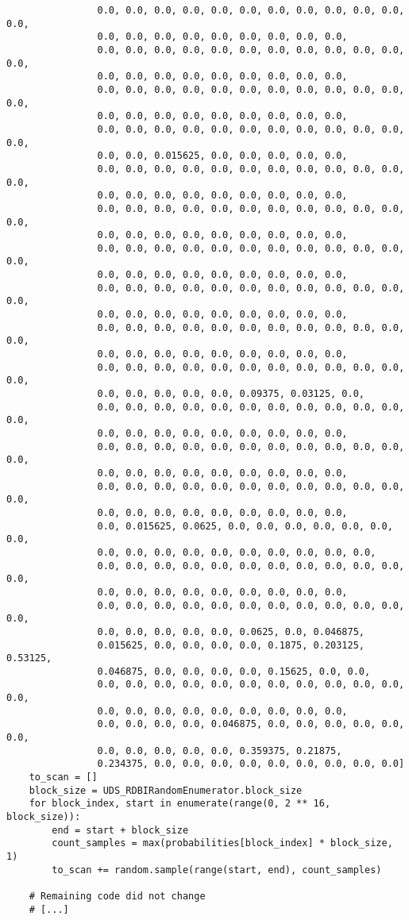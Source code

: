 \begin{verbatim}
                0.0, 0.0, 0.0, 0.0, 0.0, 0.0, 0.0, 0.0, 0.0, 0.0, 0.0, 0.0,
                0.0, 0.0, 0.0, 0.0, 0.0, 0.0, 0.0, 0.0, 0.0,
                0.0, 0.0, 0.0, 0.0, 0.0, 0.0, 0.0, 0.0, 0.0, 0.0, 0.0, 0.0,
                0.0, 0.0, 0.0, 0.0, 0.0, 0.0, 0.0, 0.0, 0.0,
                0.0, 0.0, 0.0, 0.0, 0.0, 0.0, 0.0, 0.0, 0.0, 0.0, 0.0, 0.0,
                0.0, 0.0, 0.0, 0.0, 0.0, 0.0, 0.0, 0.0, 0.0,
                0.0, 0.0, 0.0, 0.0, 0.0, 0.0, 0.0, 0.0, 0.0, 0.0, 0.0, 0.0,
                0.0, 0.0, 0.015625, 0.0, 0.0, 0.0, 0.0, 0.0,
                0.0, 0.0, 0.0, 0.0, 0.0, 0.0, 0.0, 0.0, 0.0, 0.0, 0.0, 0.0,
                0.0, 0.0, 0.0, 0.0, 0.0, 0.0, 0.0, 0.0, 0.0,
                0.0, 0.0, 0.0, 0.0, 0.0, 0.0, 0.0, 0.0, 0.0, 0.0, 0.0, 0.0,
                0.0, 0.0, 0.0, 0.0, 0.0, 0.0, 0.0, 0.0, 0.0,
                0.0, 0.0, 0.0, 0.0, 0.0, 0.0, 0.0, 0.0, 0.0, 0.0, 0.0, 0.0,
                0.0, 0.0, 0.0, 0.0, 0.0, 0.0, 0.0, 0.0, 0.0,
                0.0, 0.0, 0.0, 0.0, 0.0, 0.0, 0.0, 0.0, 0.0, 0.0, 0.0, 0.0,
                0.0, 0.0, 0.0, 0.0, 0.0, 0.0, 0.0, 0.0, 0.0,
                0.0, 0.0, 0.0, 0.0, 0.0, 0.0, 0.0, 0.0, 0.0, 0.0, 0.0, 0.0,
                0.0, 0.0, 0.0, 0.0, 0.0, 0.0, 0.0, 0.0, 0.0,
                0.0, 0.0, 0.0, 0.0, 0.0, 0.0, 0.0, 0.0, 0.0, 0.0, 0.0, 0.0,
                0.0, 0.0, 0.0, 0.0, 0.0, 0.09375, 0.03125, 0.0,
                0.0, 0.0, 0.0, 0.0, 0.0, 0.0, 0.0, 0.0, 0.0, 0.0, 0.0, 0.0,
                0.0, 0.0, 0.0, 0.0, 0.0, 0.0, 0.0, 0.0, 0.0,
                0.0, 0.0, 0.0, 0.0, 0.0, 0.0, 0.0, 0.0, 0.0, 0.0, 0.0, 0.0,
                0.0, 0.0, 0.0, 0.0, 0.0, 0.0, 0.0, 0.0, 0.0,
                0.0, 0.0, 0.0, 0.0, 0.0, 0.0, 0.0, 0.0, 0.0, 0.0, 0.0, 0.0,
                0.0, 0.0, 0.0, 0.0, 0.0, 0.0, 0.0, 0.0, 0.0,
                0.0, 0.015625, 0.0625, 0.0, 0.0, 0.0, 0.0, 0.0, 0.0, 0.0,
                0.0, 0.0, 0.0, 0.0, 0.0, 0.0, 0.0, 0.0, 0.0, 0.0,
                0.0, 0.0, 0.0, 0.0, 0.0, 0.0, 0.0, 0.0, 0.0, 0.0, 0.0, 0.0,
                0.0, 0.0, 0.0, 0.0, 0.0, 0.0, 0.0, 0.0, 0.0,
                0.0, 0.0, 0.0, 0.0, 0.0, 0.0, 0.0, 0.0, 0.0, 0.0, 0.0, 0.0,
                0.0, 0.0, 0.0, 0.0, 0.0, 0.0625, 0.0, 0.046875,
                0.015625, 0.0, 0.0, 0.0, 0.0, 0.1875, 0.203125, 0.53125,
                0.046875, 0.0, 0.0, 0.0, 0.0, 0.15625, 0.0, 0.0,
                0.0, 0.0, 0.0, 0.0, 0.0, 0.0, 0.0, 0.0, 0.0, 0.0, 0.0, 0.0,
                0.0, 0.0, 0.0, 0.0, 0.0, 0.0, 0.0, 0.0, 0.0,
                0.0, 0.0, 0.0, 0.0, 0.046875, 0.0, 0.0, 0.0, 0.0, 0.0, 0.0,
                0.0, 0.0, 0.0, 0.0, 0.0, 0.359375, 0.21875,
                0.234375, 0.0, 0.0, 0.0, 0.0, 0.0, 0.0, 0.0, 0.0, 0.0]
    to_scan = []
    block_size = UDS_RDBIRandomEnumerator.block_size
    for block_index, start in enumerate(range(0, 2 ** 16, block_size)):
        end = start + block_size
        count_samples = max(probabilities[block_index] * block_size, 1)
        to_scan += random.sample(range(start, end), count_samples)

    # Remaining code did not change
    # [...]
\end{verbatim}
